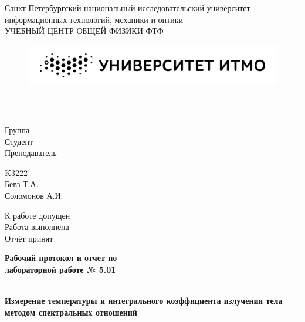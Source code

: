 \documentclass{article}
\begin{document}
\begin{minipage}{0.62\textwidth}
    \begin{center}
        Санкт-Петербургский национальный исследовательский университет \\
        информационных технологий, механики и оптики \\
        УЧЕБНЫЙ ЦЕНТР ОБЩЕЙ ФИЗИКИ ФТФ
    \end{center}
\end{minipage}
\hfill
\begin{minipage}{0.38\textwidth}
    \centering
    \begin{figure}[H]
    \includegraphics[width=\textwidth]{logo.png}
    \end{figure}
\end{minipage}

\rule{\textwidth}{1pt} \\

\begin{minipage}{0.16\textwidth}
        Группа \hrulefill\\
        Студент \hrulefill\\
        Преподаватель \hrulefill
\end{minipage}%
\begin{minipage}{0.25\textwidth}
        K3222\hrulefill\\
        Бевз Т.А.\hrulefill\\
        Соломонов А.И.\hrulefill
\end{minipage}
\hfill
\begin{minipage}{0.47\textwidth}
        К работе допущен \hrulefill\\
        Работа выполнена \hrulefill\\
        Отчёт принят \hrulefill
\end{minipage}
\begin{center}
    \textbf{\huge Рабочий протокол и отчет по \\
    лабораторной работе № 5.01}
\end{center}
\begin{minipage}{1\textwidth}
        \hrulefill\\
        \Large\textbf{Измерение температуры и интегрального коэффициента излучения тела методом спектральных отношений}\hrulefill
\end{minipage}
\end{document}
